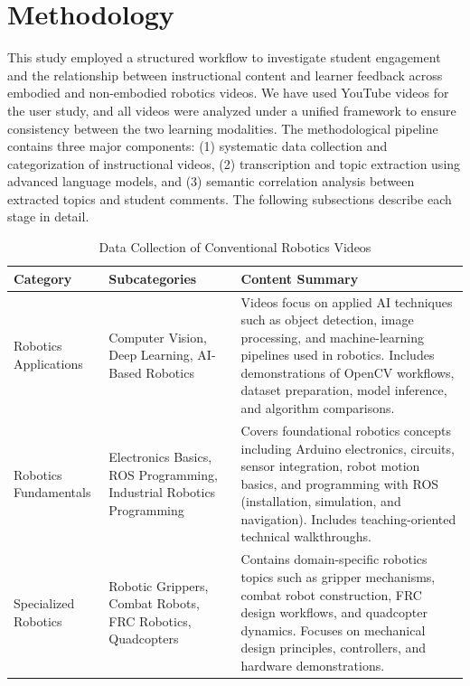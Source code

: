 \documentclass[fleqn,10pt]{JLA_article} %
\begin{document}

\section{Methodology}
\label{sec:method}

This study employed a structured workflow to investigate student engagement and the relationship between instructional content and learner feedback across embodied and non-embodied robotics videos. We have used YouTube videos for the user study, and all videos were analyzed under a unified framework to ensure consistency between the two learning modalities. The methodological pipeline contains three major components: (1) systematic data collection and categorization of instructional videos, (2) transcription and topic extraction using advanced language models, and (3) semantic correlation analysis between extracted topics and student comments. The following subsections describe each stage in detail.

\begin{table}[ht]
    \centering
    \caption{Data Collection of Conventional Robotics Videos}
    \begin{tabular}{p{3cm} p{3cm} p{7cm}}
        \toprule
        \textbf{Category} & \textbf{Subcategories} & \textbf{Content Summary} \\
        \midrule

        Robotics Applications
        & Computer Vision, Deep Learning, AI-Based Robotics
        & Videos focus on applied AI techniques such as object detection, image processing, and machine-learning pipelines used in robotics. Includes demonstrations of OpenCV workflows, dataset preparation, model inference, and algorithm comparisons. \\[6pt]

        Robotics Fundamentals
        & Electronics Basics, ROS Programming, Industrial Robotics Programming
        & Covers foundational robotics concepts including Arduino electronics, circuits, sensor integration, robot motion basics, and programming with ROS (installation, simulation, and navigation). Includes teaching-oriented technical walkthroughs. \\[6pt]

        Specialized Robotics
        & Robotic Grippers, Combat Robots, FRC Robotics, Quadcopters
        & Contains domain-specific robotics topics such as gripper mechanisms, combat robot construction, FRC design workflows, and quadcopter dynamics. Focuses on mechanical design principles, controllers, and hardware demonstrations. \\

        \bottomrule
    \end{tabular}
    \label{tab:categorized_videos}
\end{table}
\end{document}
